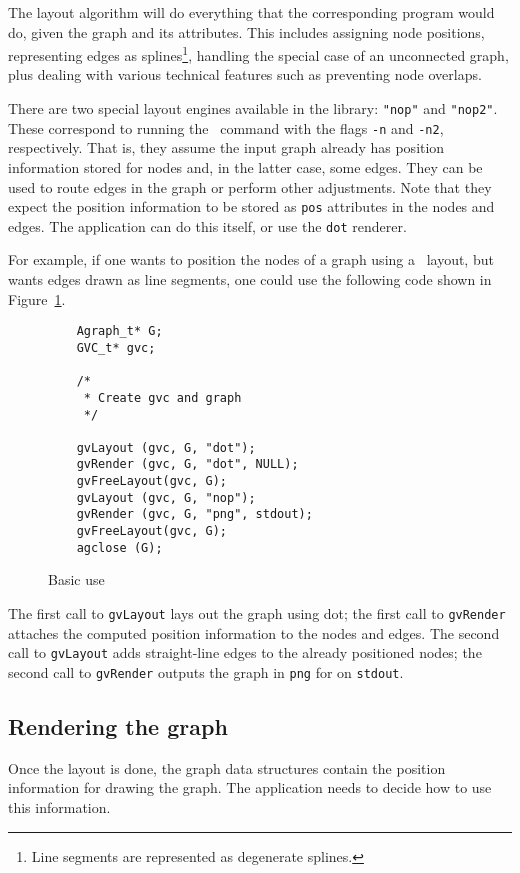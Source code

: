 The layout algorithm will do everything that the corresponding
program would do, given the graph and its attributes. This includes
assigning node positions,
representing edges as splines\footnote{
Line segments are represented as degenerate splines.
}, handling the special case of an unconnected
graph, plus dealing with various technical features such as preventing
node overlaps.

There are two special layout engines available in the library: 
{\tt "nop"} and {\tt "nop2"}. These correspond to running the
\neato\ command with the flags {\tt -n} and {\tt -n2}, respectively.
That is, they assume the input graph already has position information stored
for nodes and, in the latter case, some edges. They can be used to route
edges in the graph or perform other adjustments. Note that they expect
the position information to be stored as {\tt pos} attributes in the
nodes and edges. The application can do this itself, or use the
{\tt dot} renderer.

For example, if one wants to position the nodes of a graph using
a \dot\ layout, but wants edges drawn as line segments, one could
use the following code shown in Figure~\ref{fig:nop}.
\begin{figure}[hbt]
\begin{verbatim}
    Agraph_t* G;
    GVC_t* gvc;

    /* 
     * Create gvc and graph 
     */

    gvLayout (gvc, G, "dot");
    gvRender (gvc, G, "dot", NULL);
    gvFreeLayout(gvc, G);
    gvLayout (gvc, G, "nop");
    gvRender (gvc, G, "png", stdout);
    gvFreeLayout(gvc, G);
    agclose (G);
\end{verbatim}
\caption{Basic use}
\label{fig:nop}
\end{figure}
The first call to {\tt gvLayout} lays out the graph using dot;
the first call to {\tt gvRender} attaches the computed position
information to the nodes and edges. 
The second call to {\tt gvLayout} adds straight-line edges to the
already positioned nodes; the second call to {\tt gvRender} outputs
the graph in {\tt png} for on {\tt stdout}.

\subsection{Rendering the graph}
\label{sec:layout_info}
Once the layout is done, the graph data structures contain
the position information for drawing the graph. 
The application needs to decide how to use this information.

